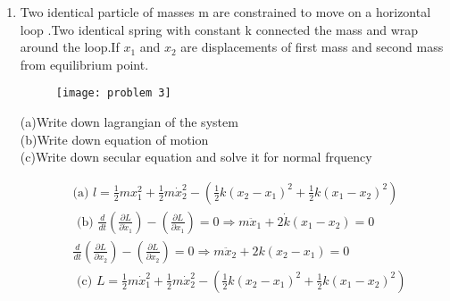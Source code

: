 \begin{enumerate}
\begin{answer}
\begin{align*}
\begin{array}{cc}
	2 k & -k \\
	-k & 2 k
	\end{array}\right)\\
	&\text { The secular equation is given by }\\
	&\left[V-\omega^{2} T\right]=0, \quad\left(\begin{array}{cc}
	2 k-\omega^{2} m & -k \\
	-k & 2 k-\omega^{2} m
	\end{array}\right)=0\\
	&\left(2 k-\omega^{2} m\right)^{2}-k^{2}=0, \omega_{1}=\sqrt{\frac{k}{m}},\text{ which is normal frequency for oscillation and another value of}\\ &\omega_{2}=\sqrt{\frac{3 k}{m}} \text{which is first over-tone.}
	\end{align*}
\end{answer}
\item Two identical particle of masses m are constrained to move on a horizontal loop .Two identical spring with constant k connected the mass and wrap around the loop.If $x_1$ and $x_2$ are displacements of first mass and second mass from equilibrium point.\\
\begin{figure}[H]
	\centering
	\texttt{[image: problem 3]}
\end{figure}
(a)Write down lagrangian of the system \\
(b)Write down equation of motion\\
(c)Write down secular equation and solve it for normal frquency
\begin{answer}
	\begin{align*}
	&\text {(a) } l=\frac{1}{2} m x_{1}^{2}+\frac{1}{2} m \dot{x}_{2}^{2}-\left(\frac{1}{2} k\left(x_{2}-x_{1}\right)^{2}+\frac{1}{2} k\left(x_{1}-x_{2}\right)^{2}\right)\\
	&\text { (b) } \frac{d}{d t}\left(\frac{\partial L}{\partial \dot{x}_{1}}\right)-\left(\frac{\partial L}{\partial x_{1}}\right)=0 \Rightarrow m \ddot{x}_{1}+2 \dot{k}\left(x_{1}-x_{2}\right)=0\\
	&\frac{d}{d t}\left(\frac{\partial L}{\partial x_{2}}\right)-\left(\frac{\partial L}{\partial x_{2}}\right)=0 \Rightarrow m \ddot{x}_{2}+2 k\left(x_{2}-x_{1}\right)=0\\
	&\text { (c) } L=\frac{1}{2} m \dot{x}_{1}^{2}+\frac{1}{2} m \dot{x}_{2}^{2}-\left(\frac{1}{2} k\left(x_{2}-x_{1}\right)^{2}+\frac{1}{2} k\left(x_{1}-x_{2}\right)^{2}\right)\\

\end{align*}
\end{answer}
\end{enumerate}
